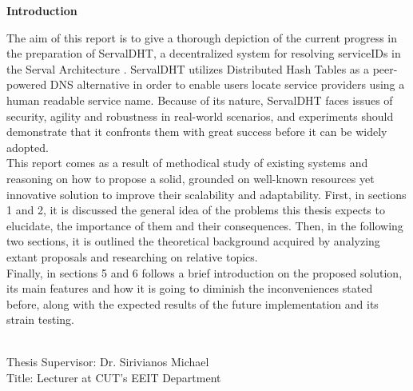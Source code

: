 \documentclass[12pt,a4paper,oneside]{article}
\begin{document}
{\Large \bf \noindent Introduction} \\[0.5cm]
The aim of this report is to give a thorough depiction of the current progress in the preparation of ServalDHT, a decentralized system for resolving serviceIDs in the Serval Architecture \cite{Nordstrom2012}.
ServalDHT utilizes Distributed Hash Tables  as a peer-powered DNS   alternative in order to enable users locate service providers using a human readable service name.
Because of its nature, ServalDHT faces issues of security, agility and robustness in real-world scenarios, and experiments should demonstrate that it confronts them with great success before it can be widely adopted.\\
\indent This report comes as a result of methodical study of existing systems and reasoning on how to propose a solid, grounded on well-known resources yet innovative solution to improve their scalability and adaptability.
First, in sections 1 and 2, it is discussed the general idea of the problems this thesis expects to elucidate, the importance of them and their consequences.
Then, in the following two sections, it is outlined the theoretical background acquired by analyzing extant proposals and researching on relative topics.\\
\indent Finally, in sections 5 and 6 follows a brief introduction on the proposed solution, its main features and how it is going to diminish the inconveniences stated before, along with the expected results of the future implementation and its strain testing.

~\\[0.5cm]
{\large
\noindent Thesis Supervisor: Dr. Sirivianos Michael\\
\noindent Title: Lecturer at CUT's EEIT Department}


\newpage
\end{document}
